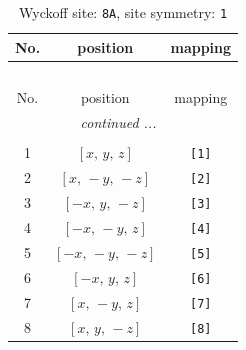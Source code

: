 \documentclass[fleqn,8pt]{jsarticle}
\begin{document}
\renewcommand{\arraystretch}{1.2}
\begin{longtable}{ccc}
\caption{Wyckoff site: {\tt 8A}, site symmetry: {\tt 1}}
 \\
 \hline \hline
No. & position & mapping \\ \hline \endfirsthead

\multicolumn{2}{l}{\tablename\ \thetable{}} \\
 \hline \hline
No. & position & mapping \\ \hline \endhead

 \hline \hline
\multicolumn{2}{r}{\footnotesize\it continued ...} \\ \endfoot

 \hline \hline
\multicolumn{2}{r}{} \\ \endlastfoot

1 & $\left[ x,\, y,\, z \right]$ & {\tt [1]} \\ \hline
2 & $\left[ x,\, - y,\, - z \right]$ & {\tt [2]} \\ \hline
3 & $\left[ - x,\, y,\, - z \right]$ & {\tt [3]} \\ \hline
4 & $\left[ - x,\, - y,\, z \right]$ & {\tt [4]} \\ \hline
5 & $\left[ - x,\, - y,\, - z \right]$ & {\tt [5]} \\ \hline
6 & $\left[ - x,\, y,\, z \right]$ & {\tt [6]} \\ \hline
7 & $\left[ x,\, - y,\, z \right]$ & {\tt [7]} \\ \hline
8 & $\left[ x,\, y,\, - z \right]$ & {\tt [8]} \\
\end{longtable}
\end{document}
